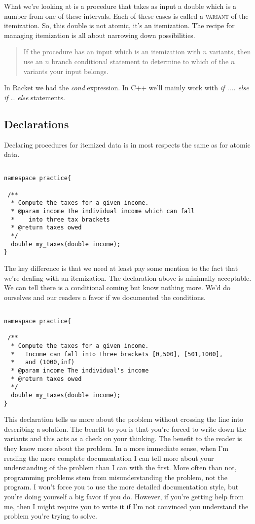 \documentclass[]{tufte-handout}
\begin{document}
What we're looking at is a procedure that takes as input a double which is a number from one of these intervals. Each of these cases is called a \textsc{variant} of the itemization. So, this double is not atomic, it's an itemization. The recipe for managing itemization is all about narrowing down possibilities.
\begin{quote}
If the procedure has an input which is an itemization with $n$ variants, then use an $n$ branch conditional statement to determine to which of the $n$ variants your input belongs.
\end{quote}

In Racket we had the \textit{cond} expression. In C++ we'll mainly work with \textit{if .... else if .. else} statements.

\subsection{Declarations}

Declaring procedures for itemized data is in most respects the same as for atomic data. 

\begin{verbatim}

namespace practice{

 /** 
  * Compute the taxes for a given income.
  * @param income The individual income which can fall 
  *    into three tax brackets
  * @return taxes owed
  */
  double my_taxes(double income);
}

\end{verbatim}

The key difference is that we need at least pay some mention to the fact that we're dealing with an itemization.  The declaration above is minimally acceptable. We can tell there is a conditional coming but know nothing more. We'd do ourselves and our readers a favor if we documented the conditions.
\begin{verbatim}

namespace practice{

 /** 
  * Compute the taxes for a given income.
  *   Income can fall into three brackets [0,500], [501,1000], 
  *   and (1000,inf)
  * @param income The individual's income 
  * @return taxes owed
  */
  double my_taxes(double income);
}

\end{verbatim}

This declaration tells us more about the problem without crossing the line into describing a solution. The benefit to you is that you're forced to write down the variants and this acts as a check on your thinking. The benefit to the reader is they know more about the problem. In a more immediate sense, when I'm reading the more complete documentation I can tell more about your understanding of the problem than I can with the first. More often than not, programming problems stem from misunderstanding the problem, not the program. I won't force you to use the more detailed documentation style, but you're doing yourself a big favor if you do. However, if you're getting help from me, then I might require you to write it if I'm not convinced you understand the problem you're trying to solve. 
\end{document}

